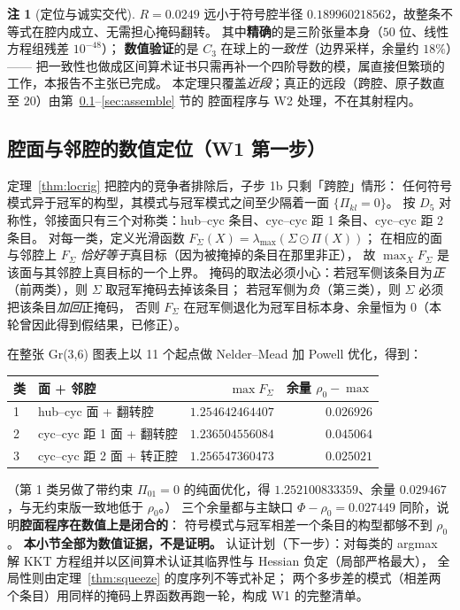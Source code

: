 \documentclass[UTF8,11pt]{ctexart}
\theoremstyle{definition}
\newtheorem{remark}[theorem]{注}
\begin{document}
\begin{remark}[定位与诚实交代]
$R=0.0249$ 远小于符号腔半径 $0.189960218562$，故整条不等式在腔内成立、无需担心掩码翻转。
其中\textbf{精确}的是三阶张量本身（$50$ 位、线性方程组残差 $10^{-48}$）；
\textbf{数值验证}的是 $C_3$ 在球上的\emph{一致性}（边界采样，余量约 $18\%$）——
把一致性也做成区间算术证书只需再补一个四阶导数的模，属直接但繁琐的工作，本报告不主张已完成。
本定理只覆盖\emph{近段}；真正的远段（跨腔、原子数直至 $20$）由第~\ref{sec:walls}--\ref{sec:assemble} 节的
腔面程序与 W2 处理，不在其射程内。
\end{remark}

\subsection{腔面与邻腔的数值定位（W1 第一步）}\label{sec:walls}

定理~\ref{thm:locrig} 把腔内的竞争者排除后，子步 1b 只剩「跨腔」情形：
任何符号模式异于冠军的构型，其模式与冠军模式之间至少隔着一面 $\{\Pi_{kl}=0\}$。
按 $D_5$ 对称性，邻接面只有三个对称类：hub--cyc 条目、cyc--cyc 距 1 条目、cyc--cyc 距 2 条目。
对每一类，定义光滑函数 $F_\Sigma(X)=\lambda_{\max}(\Sigma\odot\Pi(X))$；
在相应的面与邻腔上 $F_\Sigma$ \emph{恰好等于}真目标（因为被掩掉的条目在那里非正），
故 $\max_X F_\Sigma$ 是该面与其邻腔上真目标的一个上界。
掩码的取法必须小心：若冠军侧该条目为\emph{正}（前两类），则 $\Sigma$ 取冠军掩码去掉该条目；
若冠军侧为\emph{负}（第三类），则 $\Sigma$ 必须把该条目\emph{加回}正掩码，
否则 $F_\Sigma$ 在冠军侧退化为冠军目标本身、余量恒为 $0$（本轮曾因此得到假结果，已修正）。

在整张 Gr(3,6) 图表上以 11 个起点做 Nelder--Mead 加 Powell 优化，得到：

\begin{center}
{\small
\begin{tabular}{@{}llrr@{}}
\toprule
类 & 面 + 邻腔 & $\max F_\Sigma$ & 余量 $\rho_0-\max$ \\
\midrule
1 & hub--cyc 面 + 翻转腔 & $1.254642464407$ & $0.026926$ \\
2 & cyc--cyc 距 1 面 + 翻转腔 & $1.236504556084$ & $0.045064$ \\
3 & cyc--cyc 距 2 面 + 转正腔 & $1.256547360473$ & $0.025021$ \\
\bottomrule
\end{tabular}}
\end{center}

（第 1 类另做了带约束 $\Pi_{01}=0$ 的纯面优化，得 $1.252100833359$、余量 $0.029467$，与无约束版一致地低于 $\rho_0$。）
三个余量都与主缺口 $\Phi-\rho_0=0.027449$ 同阶，说明\textbf{腔面程序在数值上是闭合的}：
符号模式与冠军相差一个条目的构型都够不到 $\rho_0$。
\textbf{本小节全部为数值证据，不是证明。}
认证计划（下一步）：对每类的 argmax 解 KKT 方程组并以区间算术认证其临界性与 Hessian 负定（局部严格最大），
全局性则由定理~\ref{thm:squeeze} 的度序列不等式补足；
两个多步差的模式（相差两个条目）用同样的掩码上界函数再跑一轮，构成 W1 的完整清单。
\end{document}
